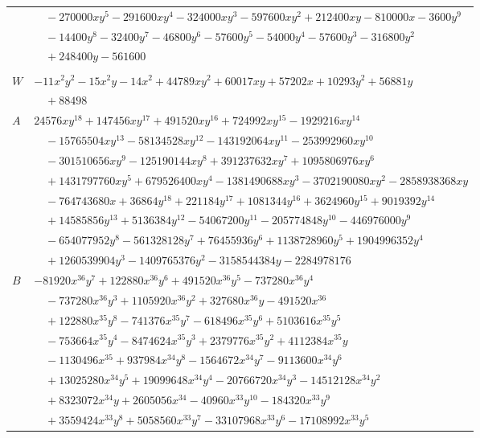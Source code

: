 \documentclass[11pt]{article}
\begin{document}
\begin{longtable}{@{}ll@{}}
 & $\quad -270000xy^{5}-291600xy^{4}-324000xy^{3}-597600xy^{2}+212400xy-810000x-3600y^{9}$\\
 & $\quad -14400y^{8}-32400y^{7}-46800y^{6}-57600y^{5}-54000y^{4}-57600y^{3}-316800y^{2}$\\
 & $\quad +248400y-561600$\\
\addlinespace[3pt]
\multicolumn{2}{@{}l}{$i=1$, $m=64$, neighbours $0,7,9,11,14,17,20,22,25,28,31,33,35,40,48,53,56,58,60,61,186$}\\
$W$ & $-11x^{2}y^{2}-15x^{2}y-14x^{2}+44789xy^{2}+60017xy+57202x+10293y^{2}+56881y$\\
 & $\quad +88498$\\
$A$ & $24576xy^{18}+147456xy^{17}+491520xy^{16}+724992xy^{15}-1929216xy^{14}$\\
 & $\quad -15765504xy^{13}-58134528xy^{12}-143192064xy^{11}-253992960xy^{10}$\\
 & $\quad -301510656xy^{9}-125190144xy^{8}+391237632xy^{7}+1095806976xy^{6}$\\
 & $\quad +1431797760xy^{5}+679526400xy^{4}-1381490688xy^{3}-3702190080xy^{2}-2858938368xy$\\
 & $\quad -764743680x+36864y^{18}+221184y^{17}+1081344y^{16}+3624960y^{15}+9019392y^{14}$\\
 & $\quad +14585856y^{13}+5136384y^{12}-54067200y^{11}-205774848y^{10}-446976000y^{9}$\\
 & $\quad -654077952y^{8}-561328128y^{7}+76455936y^{6}+1138728960y^{5}+1904996352y^{4}$\\
 & $\quad +1260539904y^{3}-1409765376y^{2}-3158544384y-2284978176$\\
$B$ & $-81920x^{36}y^{7}+122880x^{36}y^{6}+491520x^{36}y^{5}-737280x^{36}y^{4}$\\
 & $\quad -737280x^{36}y^{3}+1105920x^{36}y^{2}+327680x^{36}y-491520x^{36}$\\
 & $\quad +122880x^{35}y^{8}-741376x^{35}y^{7}-618496x^{35}y^{6}+5103616x^{35}y^{5}$\\
 & $\quad -753664x^{35}y^{4}-8474624x^{35}y^{3}+2379776x^{35}y^{2}+4112384x^{35}y$\\
 & $\quad -1130496x^{35}+937984x^{34}y^{8}-1564672x^{34}y^{7}-9113600x^{34}y^{6}$\\
 & $\quad +13025280x^{34}y^{5}+19099648x^{34}y^{4}-20766720x^{34}y^{3}-14512128x^{34}y^{2}$\\
 & $\quad +8323072x^{34}y+2605056x^{34}-40960x^{33}y^{10}-184320x^{33}y^{9}$\\
 & $\quad +3559424x^{33}y^{8}+5058560x^{33}y^{7}-33107968x^{33}y^{6}-17108992x^{33}y^{5}$\\

\end{longtable}
\end{document}

